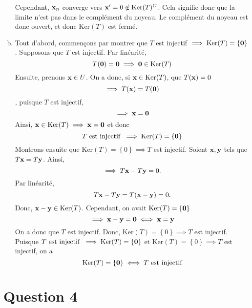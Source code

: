 \documentclass[letterpaper,12pt,oneside,final]{book}
\begin{document}
\begin{enumerate}[a)]
Cependant, \( \vb{x}_{n} \) converge vers \( \vb{x'} = {0} \notin \text{Ker}(T)^{C} \). Cela signifie donc que la limite 
n'est pas dans le complément du noyeau. Le complément du noyeau est donc ouvert, et donc \( \text{Ker}(T) \) est fermé. 


\item %
Tout d'abord, commençons par montrer que \( T \) est injectif \( \implies  \text{Ker}(T) = \left\{ \vb{0} \right\} \). 
Supposons que \( T \) est injectif. Par linéarité, 
\[ T(\vb{0}) = \vb{0} \implies \vb{0} \in \text{Ker}(T) \]
Ensuite, prenons \( \vb{x} \in U \).
On a donc, si \( \vb{x} \in \text{Ker}(T)\), que \( T(\vb{x}) = 0 \)\[ \implies T(\vb{x}) = T(\vb{0})\], puisque \( T \) est injectif, 
\[ \implies \vb{x} = \vb{0} \]
Ainsi, \( \vb{x} \in \text{Ker}(T) \implies \vb{x} = \vb{0}\) et donc 
\[ T \text{ est injectif } \implies \text{Ker}(T) = \left\{ \vb{0} \right\} \]
Montrons ensuite que \( \text{Ker}(T) = \left\{ 0 \right\} \implies T \) est injectif. 
Soient \( \vb{x},\vb{y} \) tels que \( T\vb{x} = T\vb{y} \). Ainsi, 
\[ \implies T\vb{x}-T\vb{y} = 0 .\]
Par linéarité, 
\[ T\vb{x} - T\vb{y} = T(\vb{x}-\vb{y}) = 0 .\]
Donc, \( \vb{x}-\vb{y} \in \text{Ker}(T) \). 
Cependant, on avait \( \text{Ker}(T) = \left\{ \vb{0} \right\}  \)
\[ \implies \vb{x} - \vb{y} = \vb{0} \iff \vb{x} = \vb{y} \]
On a donc que \( T \) est injectif. 
Donc, \( \text{Ker}(T)=\left\{ 0 \right\} \implies T \) est injectif. 
\\ 

Puisque \( T \text{ est injectif } \implies \text{Ker}(T) = \left\{ \vb{0} \right\} \) et 
\( \text{Ker}(T)=\left\{ 0 \right\} \implies T \) est injectif, on a 
\[ \text{Ker}(T) = \left\{ \vb{0} \right\} \iff T \text{ est injectif} \]


\end{enumerate}


\newpage
\section*{Question 4}
\end{document}
